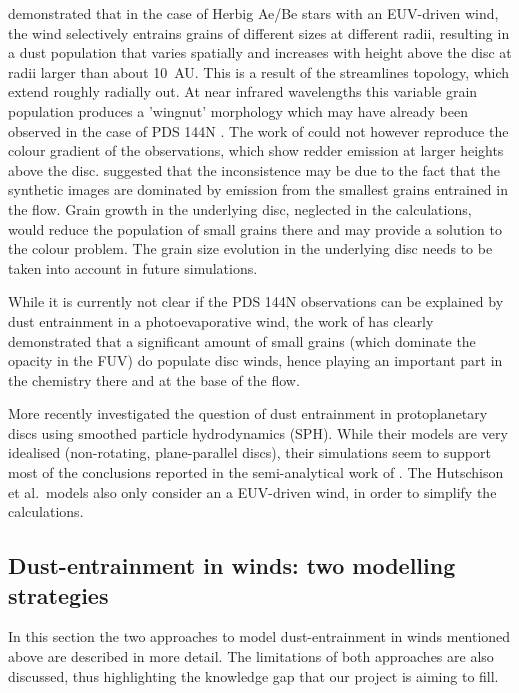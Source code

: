 \documentclass[10pt,fleqn,twoside]{article}
\begin{document}
\citet{2011MNRAS.411.1104O} demonstrated that in the case of
Herbig Ae/Be stars with an EUV-driven wind, the wind selectively entrains
grains of different sizes at different radii, resulting in a dust
population that varies spatially and increases with height above the
disc at radii larger than about 10~AU. This is a  result of the
streamlines topology, which extend roughly radially out. At near
infrared wavelengths 
this variable grain population produces a 'wingnut' morphology which
may have already been observed in the case of PDS 144N 
\citep{2006ApJ...645.1272P}. The work of \citet{2011MNRAS.411.1104O} could not however reproduce the
colour gradient of the observations, which show redder emission at
larger heights above the disc. \citet{2011MNRAS.411.1104O} suggested that the
inconsistence may be due to the
fact that the synthetic images are dominated by emission from the
smallest grains entrained in the flow. Grain growth in the underlying
disc, neglected in the
\citet{2011MNRAS.411.1104O} calculations, would reduce the population of
small grains there and may provide a solution to
the colour problem. The grain size evolution in the underlying disc
needs to be taken into account in future simulations. 

While it is currently not clear if the PDS 144N observations can be
explained by dust entrainment in a photoevaporative wind, the work of
\citet{2011MNRAS.411.1104O} has clearly demonstrated that a
significant amount of small grains (which dominate the opacity in the
FUV) do populate disc winds, hence playing an important part in the
chemistry there and at the base of the flow. 

More recently \citet{2016MNRAS.463.2725H, 2016MNRAS.461..742H}
investigated the question of
dust entrainment in protoplanetary discs using smoothed particle
hydrodynamics (SPH). While their models are very idealised (non-rotating,
plane-parallel discs), their simulations seem to support most of the
conclusions reported in the semi-analytical work of \citet{2011MNRAS.411.1104O}. 
The Hutschison et al.\ models also only consider an a
EUV-driven wind, in order to simplify the calculations.  

\subsection{Dust-entrainment in winds: two modelling strategies}

In this section the two approaches to model dust-entrainment in
winds mentioned above are described in more detail. The limitations of
both approaches are also discussed, thus highlighting the knowledge
gap that our project is aiming to fill. 
\end{document}
